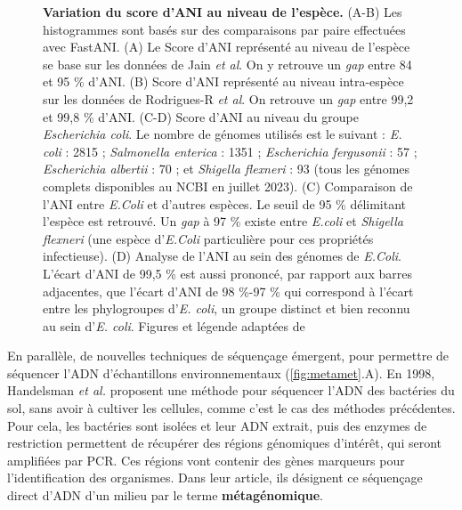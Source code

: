 \begin{figure}[htbp]
    \caption[Variation du score d'ANI au niveau de l'espèce]{\textbf{Variation du score d'ANI au niveau de l'espèce.} (A-B) Les histogrammes sont basés sur des comparaisons par paire effectuées avec FastANI. (A) Le Score d'ANI représenté au niveau de l'espèce se base sur les données de Jain \textit{et al}. On y retrouve un \textit{gap} entre 84 et 95 \% d'ANI. (B) Score d'ANI représenté au niveau intra-espèce sur les données de Rodrigues-R \textit{et al}. On retrouve un \textit{gap} entre 99,2 et 99,8 \% d'ANI. (C-D) Score d'ANI au niveau du groupe \textit{Escherichia coli}. Le nombre de génomes utilisés est le suivant : \textit{E. coli} : 2815 ; \textit{Salmonella enterica} : 1351 ; \textit{Escherichia fergusonii} : 57 ; \textit{Escherichia albertii} : 70 ; et \textit{Shigella flexneri} : 93 (tous les génomes complets disponibles au NCBI en juillet 2023). (C) Comparaison de l'ANI entre \textit{E.Coli} et d'autres espèces. Le seuil de 95 \% délimitant l'espèce est retrouvé. Un \textit{gap} à 97 \% existe entre \textit{E.coli} et \textit{Shigella flexneri} (une espèce d'\textit{E.Coli} particulière pour ces propriétés infectieuse). (D) Analyse de l'ANI au sein des génomes de \textit{E.Coli}. L'écart d'ANI de 99,5 \% est aussi prononcé, par rapport aux barres adjacentes, que l'écart d'ANI de 98 \%-97 \% qui correspond à l'écart entre les phylogroupes d'\textit{E. coli}, un groupe distinct et bien reconnu au sein d'\textit{E. coli}. Figures et légende adaptées de \cite{konstantinidis_sequence-discrete_2023}}
    \label{fig:ANI_gap_sp}
\end{figure}

En parallèle, de nouvelles techniques de séquençage émergent, pour permettre de séquencer l'ADN d'échantillons environnementaux (\autoref{fig:metamet}.A). En 1998, Handelsman \textit{et al.} \cite{handelsman_molecular_1998} proposent une méthode pour séquencer l'ADN des bactéries du sol, sans avoir à cultiver les cellules, comme c'est le cas des méthodes précédentes. Pour cela, les bactéries sont isolées et leur ADN extrait, puis des enzymes de restriction permettent de récupérer des régions génomiques d'intérêt, qui seront amplifiées par PCR. Ces régions vont contenir des gènes marqueurs pour l'identification des organismes. Dans leur article, ils désignent ce séquençage direct d'ADN d'un milieu par le terme \textbf{métagénomique}.

